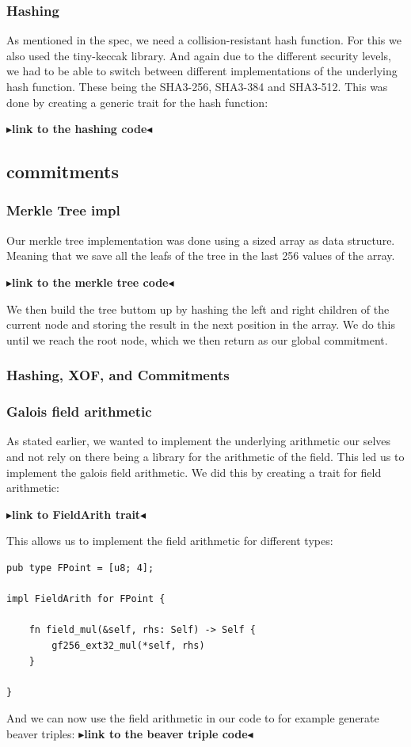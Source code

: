 \documentclass[twoside,11pt]{report}
\theoremstyle{definition}
\theoremstyle{plain}
\newcommand{\todo}[1]{{\color[rgb]{.5,0,0}\textbf{$\blacktriangleright$#1$\blacktriangleleft$}}}
\begin{document}
\subsubsection{Hashing}\label{sec:hashing} %
As mentioned in the spec, we need a collision-resistant hash function. For this we also used the tiny-keccak library. And again due to the different security levels, we had to be able to switch between different implementations of the underlying hash function. These being the SHA3-256, SHA3-384 and SHA3-512.
This was done by creating a generic trait for the hash function:

\todo{link to the hashing code}

%
\subsection{commitments}

\subsubsection{Merkle Tree impl}\label{sub:merkle_tree_impl}
Our merkle tree implementation was done using a sized array as data structure. Meaning that we save all the leafs of the tree in the last 256 values of the array.

\todo{link to the merkle tree code}

We then build the tree buttom up by hashing the left and right children of the current node and storing the result in the next position in the array. We do this until we reach the root node, which we then return as our global commitment.


\subsubsection{Hashing, XOF, and Commitments}

\subsubsection{Galois field arithmetic}\label{sub:gf256_arith}
As stated earlier, we wanted to implement the underlying arithmetic our selves and not rely on there being a library for the arithmetic of the field. This led us to implement the galois field arithmetic.
We did this by creating a trait for field arithmetic:

\todo{link to FieldArith trait}

This allows us to implement the field arithmetic for different types:
\begin{verbatim}
pub type FPoint = [u8; 4];

impl FieldArith for FPoint {

    fn field_mul(&self, rhs: Self) -> Self {
        gf256_ext32_mul(*self, rhs)
    }

}
\end{verbatim}
And we can now use the field arithmetic in our code to for example generate beaver triples:
\todo{link to the beaver triple code}
\end{document}

